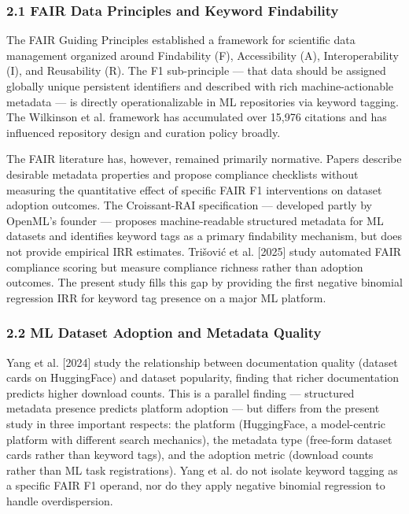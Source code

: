 
\subsubsection{2.1 FAIR Data Principles and Keyword Findability}

The FAIR Guiding Principles \citep{Wilkinson2016FAIR} established a framework for scientific data management organized around Findability (F), Accessibility (A), Interoperability (I), and Reusability (R). The F1 sub-principle --- that data should be assigned globally unique persistent identifiers and described with rich machine-actionable metadata --- is directly operationalizable in ML repositories via keyword tagging. The Wilkinson et al. framework has accumulated over 15,976 citations and has influenced repository design and curation policy broadly.

The FAIR literature has, however, remained primarily normative. Papers describe desirable metadata properties and propose compliance checklists without measuring the quantitative effect of specific FAIR F1 interventions on dataset adoption outcomes. The Croissant-RAI specification \citep{Jain2024Croissant} --- developed partly by OpenML's founder --- proposes machine-readable structured metadata for ML datasets and identifies keyword tags as a primary findability mechanism, but does not provide empirical IRR estimates. Trišović et al. [2025] study automated FAIR compliance scoring but measure compliance richness rather than adoption outcomes. The present study fills this gap by providing the first negative binomial regression IRR for keyword tag presence on a major ML platform.

\subsubsection{2.2 ML Dataset Adoption and Metadata Quality}

Yang et al. [2024] study the relationship between documentation quality (dataset cards on HuggingFace) and dataset popularity, finding that richer documentation predicts higher download counts. This is a parallel finding --- structured metadata presence predicts platform adoption --- but differs from the present study in three important respects: the platform (HuggingFace, a model-centric platform with different search mechanics), the metadata type (free-form dataset cards rather than keyword tags), and the adoption metric (download counts rather than ML task registrations). Yang et al. do not isolate keyword tagging as a specific FAIR F1 operand, nor do they apply negative binomial regression to handle overdispersion.

